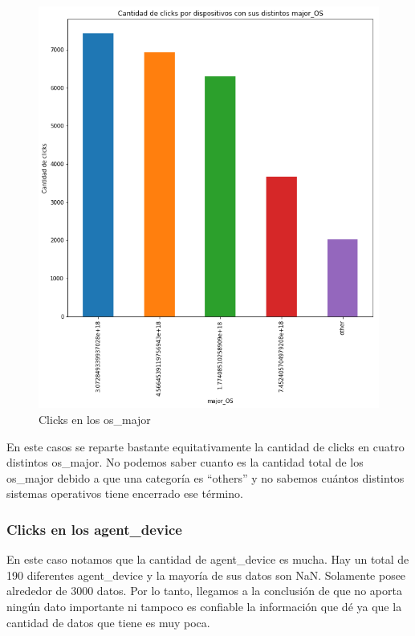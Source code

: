 \documentclass[a4paper, 12pt]{article}
\begin{document}
		
		\begin{figure}[H]
			\centering
			\includegraphics[scale = 0.5]{images/clicks/clicks_major_OS.png}
			\caption{Clicks en los os\_major}
		\end{figure}
		

		 En este casos se reparte bastante equitativamente la cantidad de clicks en cuatro distintos os\_major.
		No podemos saber cuanto es la cantidad total de los os\_major debido a que una categoría es ``others'' y no sabemos
		cuántos distintos sistemas operativos tiene encerrado ese término.

	\subsubsection{Clicks en los agent\_device}
		 En este caso notamos que la cantidad de agent\_device es mucha. Hay un total de 190 diferentes agent\_device
		y la mayoría de sus datos son NaN. Solamente posee alrededor de 3000 datos. Por lo tanto, llegamos a la conclusión
		de que no aporta ningún dato importante ni tampoco es confiable la información que dé ya que la cantidad de datos
		que tiene es muy poca.
\end{document}
